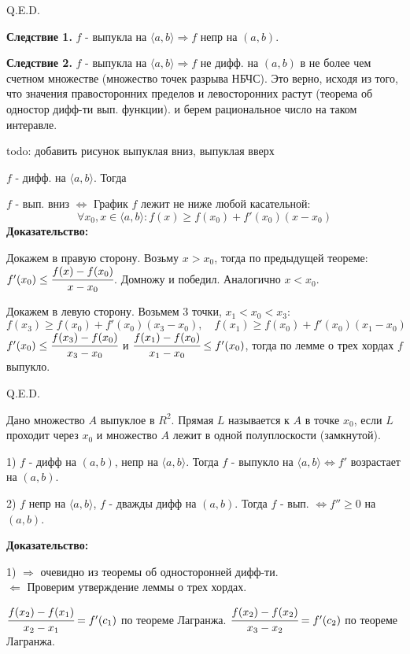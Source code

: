 \hfill Q.E.D.

\textbf{Следствие 1.} $f$ - выпукла на $\langle a,b\rangle \Rightarrow f$ непр на $(a,b)$.

\textbf{Следствие 2.} $f$ - выпукла на $\langle a,b\rangle \Rightarrow f$ не дифф. на $(a,b)$ в не более чем счетном множестве (множество точек разрыва НБЧС). Это верно, исходя из того, что значения правосторонних пределов и левосторонних растут (теорема об одностор дифф-ти вып. функции). и берем рациональное число на таком интеравле.

todo: добавить рисунок выпуклая вниз, выпуклая вверх


$f$ - дифф. на $\langle a,b \rangle$. Тогда

$f$ - вып. вниз $\Leftrightarrow$ График $f$ лежит не ниже любой касательной:
$$\forall x_0,x \in \langle a,b\rangle: f(x) \geq f(x_0) + f'(x_0)(x-x_0)$$
\textbf{Доказательство:}

Докажем в правую сторону. Возьму $x>x_0$, тогда по предыдущей теореме: $f'(x_0)\leq \cfrac{f(x)-f(x_0)}{x-x_0}$. Домножу и победил. Аналогично $x<x_0$.

Докажем в левую сторону. Возьмем 3 точки, $x_1<x_0<x_3$:
$$f(x_3)\geq f(x_0)+f'(x_0)(x_3-x_0),\quad f(x_1)\geq f(x_0)+f'(x_0)(x_1-x_0)$$
$f'(x_0)\leq \cfrac{f(x_3)-f(x_0)}{x_3-x_0}$ и $ \cfrac{f(x_1)-f(x_0)}{x_1-x_0} \leq f'(x_0)$, тогда  по лемме о трех хордах $f$ выпукло.

\hfill Q.E.D.


 Дано множество $A$ выпуклое в $R^2$. Прямая $L$ называется  к $A$ в точке $x_0$, если $L$ проходит через $x_0$ и множество $A$ лежит в одной полуплоскости (замкнутой).


1) $f$ - дифф на $(a,b)$, непр на $\langle a,b \rangle$. Тогда $f$ - выпукло на $\langle a,b\rangle \Leftrightarrow f'$ возрастает на $(a,b)$.

2) $f$ непр на $\langle a,b \rangle$, $f$ - дважды дифф на $(a,b)$. Тогда $f$ - вып. $\Leftrightarrow f''\geq 0$ на $(a,b)$.

\textbf{Доказательство:}

1) $\Rightarrow$ очевидно из теоремы об односторонней дифф-ти.\\
$\Leftarrow$ Проверим утверждение леммы о трех хордах. 

$\cfrac{f(x_2)-f(x_1)}{x_2-x_1}= f'(c_1) $ по теореме Лагранжа.
$\cfrac{f(x_2)-f(x_2)}{x_3-x_2}= f'(c_2) $ по теореме Лагранжа.


